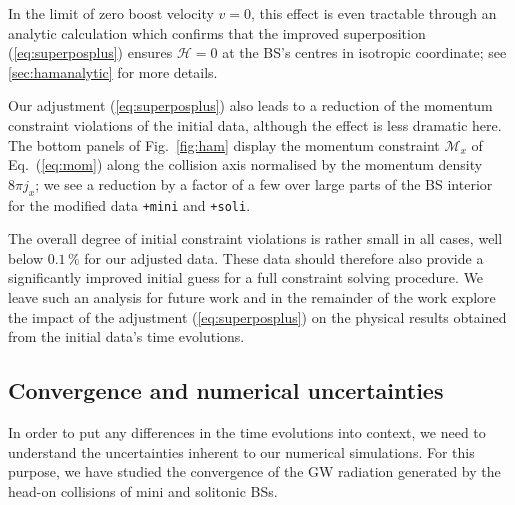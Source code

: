 \documentclass[]{iopart}
\begin{document}
In the limit of zero boost velocity $v=0$, this effect is even
tractable through an analytic calculation which confirms that the
improved superposition (\ref{eq:superposplus}) ensures $\mathcal{H}=0$
at the BS's centres in isotropic coordinate; see \ref{sec:hamanalytic}
for more details.

Our adjustment (\ref{eq:superposplus}) also leads to a reduction
of the momentum constraint violations of the initial data, although
the effect is less dramatic here.  The bottom panels of Fig.~\ref{fig:ham}
display the momentum constraint $\mathcal{M}_x$ of Eq.~(\ref{eq:mom})
along the collision axis normalised by the momentum density $8\pi
j_x$; we see a reduction by a factor of a few over large parts of
the BS interior for the modified data {\tt +mini} and {\tt +soli}.

The overall degree of initial constraint violations is rather small
in all cases, well below $0.1\,\%$ for our adjusted data. These
data should therefore also provide a significantly improved initial
guess for a full constraint solving procedure. We leave such an
analysis for future work and in the remainder of the work explore
the impact of the adjustment (\ref{eq:superposplus}) on the physical
results obtained from the initial data's time evolutions.

\subsection{Convergence and numerical uncertainties}
%
In order to put any differences in the time evolutions into context,
we need to understand the uncertainties inherent to our numerical
simulations. For this purpose, we have studied the convergence of
the GW radiation generated by the head-on collisions of mini and
solitonic BSs.
\end{document}
